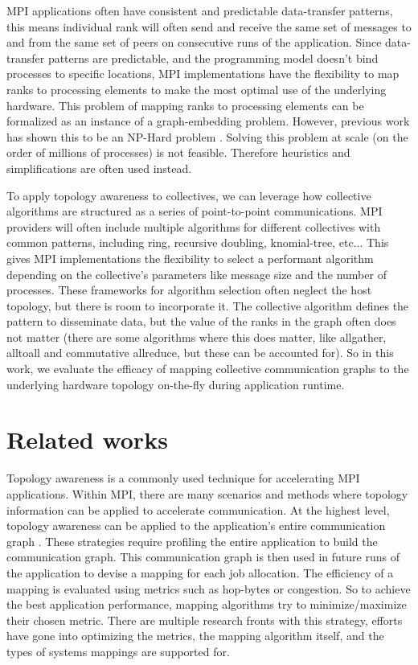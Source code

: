 MPI applications often have consistent and predictable data-transfer patterns, this means individual rank will often send and receive the same set of messages to and from the same set of peers on consecutive runs of the application.
Since data-transfer patterns are predictable, and the programming model doesn't bind processes to specific locations, MPI implementations have the flexibility to map ranks to processing elements to make the most optimal use of the underlying hardware.
This problem of mapping ranks to processing elements can be formalized as an instance of a graph-embedding problem.
However, previous work has shown this to be an NP-Hard problem \cite{Hoefler2011GenericTopoMappingStrats}. 
Solving this problem at scale (on the order of millions of processes) is not feasible. Therefore heuristics and simplifications are often used instead.

To apply topology awareness to collectives, we can leverage how collective algorithms are structured as a series of point-to-point communications.
MPI providers will often include multiple algorithms for different collectives with common patterns, including ring, recursive doubling, knomial-tree, etc...
This gives MPI implementations the flexibility to select a performant algorithm depending on the collective's parameters like message size and the number of processes.
These frameworks for algorithm selection often neglect the host topology, but there is room to incorporate it.
The collective algorithm defines the pattern to disseminate data, but the value of the ranks in the graph often does not matter (there are some algorithms where this does matter, like allgather, alltoall and commutative allreduce, but these can be accounted for).
So in this work, we evaluate the efficacy of mapping collective communication graphs to the underlying hardware topology on-the-fly during application runtime.

\section{Related works}
Topology awareness is a commonly used technique for accelerating MPI applications. 
Within MPI, there are many scenarios and methods where topology information can be applied to accelerate communication.
At the highest level, topology awareness can be applied to the application's entire communication graph \cite{Hoefler2011GenericTopoMappingStrats, Mirsadeghi2016PTRAM, Faraji2016TopoAwareGPUSelection, Mirsadeghi2016MAGC, Galvez2017AutoTopoMap}.
These strategies require profiling the entire application to build the communication graph.
This communication graph is then used in future runs of the application to devise a mapping for each job allocation.
The efficiency of a mapping is evaluated using metrics such as hop-bytes or congestion.
So to achieve the best application performance, mapping algorithms try to minimize/maximize their chosen metric.
There are multiple research fronts with this strategy, efforts have gone into optimizing the metrics, the mapping algorithm itself, and the types of systems mappings are supported for.


